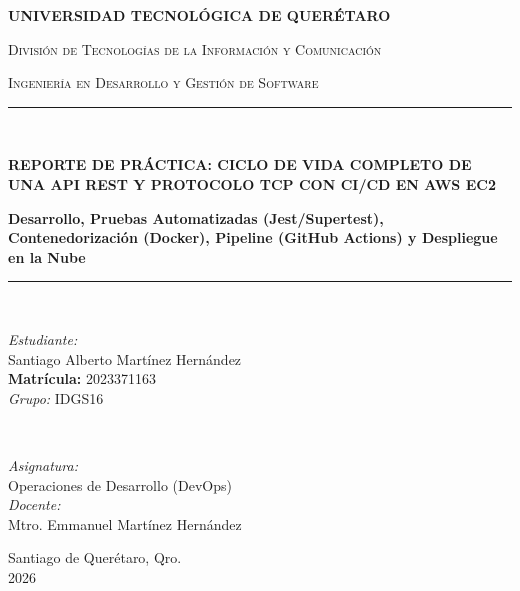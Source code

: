 \documentclass[12pt,letterpaper]{article}
\begin{document}
\begin{titlepage}
    \centering
    \vspace*{0.5cm}
    
    {\bfseries\Large UNIVERSIDAD TECNOLÓGICA DE QUERÉTARO \par}
    \vspace{0.3cm}
    {\scshape\large División de Tecnologías de la Información y Comunicación \par}
    \vspace{0.2cm}
    {\scshape\small Ingeniería en Desarrollo y Gestión de Software \par}
    \vspace{1.2cm}
    
    \rule{\linewidth}{0.5mm} \\[0.4cm]
    {\huge\bfseries REPORTE DE PRÁCTICA: CICLO DE VIDA COMPLETO DE UNA API REST Y PROTOCOLO TCP CON CI/CD EN AWS EC2 \par}
    \vspace{0.3cm}
    {\large\bfseries Desarrollo, Pruebas Automatizadas (Jest/Supertest), Contenedorización (Docker), Pipeline (GitHub Actions) y Despliegue en la Nube \par}
    \rule{\linewidth}{0.5mm} \\[1.2cm]
    
    \begin{minipage}{0.48\textwidth}
        \begin{flushleft} \large
            \emph{Estudiante:}\\
            Santiago Alberto Martínez Hernández \\
            \textbf{Matrícula:} 2023371163 \\[0.3cm]
            \emph{Grupo:} IDGS16
        \end{flushleft}
    \end{minipage}
    ~
    \begin{minipage}{0.48\textwidth}
        \begin{flushright} \large
            \emph{Asignatura:} \\
            Operaciones de Desarrollo (DevOps) \\[0.3cm]
            \emph{Docente:} \\
            Mtro. Emmanuel Martínez Hernández
        \end{flushright}
    \end{minipage}
    
    \vfill
    
    {\large Santiago de Querétaro, Qro. \\ 2026 \par}
\end{titlepage}
\end{document}
